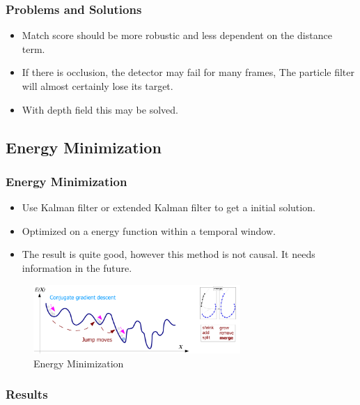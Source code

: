 \documentclass{beamer}
\begin{document}
\begin{frame}
	\frametitle{Problems and Solutions}
	\begin{itemize}
		\item Match score should be more robustic and less dependent on the distance term.
		\item If there is occlusion, the detector may fail for many frames, The particle filter will almost certainly lose its target.
		\item With depth field this may be solved.
	\end{itemize}
\end{frame}

\subsection{Energy Minimization}
\begin{frame}
	\frametitle{Energy Minimization\scriptsize\cite{Milan:2014:CEM}}
	\begin{itemize}
		\item Use Kalman filter or extended Kalman filter to get a initial solution.
		\item Optimized on a energy function within a temporal window.
		\item The result is quite good, however this method is not causal. It needs information in the future.
	\end{itemize}
	\begin{figure}
		\begin{center}
			\includegraphics[width=0.7\textwidth]{images/energy.png}
			\caption{Energy Minimization}
		\end{center}
	\end{figure}
\end{frame}

\begin{frame}
	\frametitle{Results}
	\begin{center}
	\end{center}
\end{frame}
\end{document}
